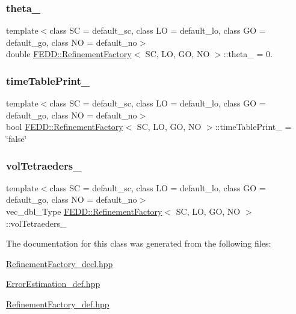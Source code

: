 \subsubsection{\texorpdfstring{theta\+\_\+}{theta\_}}
{\footnotesize\ttfamily template$<$class SC  = default\+\_\+sc, class LO  = default\+\_\+lo, class GO  = default\+\_\+go, class NO  = default\+\_\+no$>$ \\
double \hyperlink{classFEDD_1_1RefinementFactory}{F\+E\+D\+D\+::\+Refinement\+Factory}$<$ SC, LO, GO, NO $>$\+::theta\+\_\+ = 0.}

\mbox{\label{classFEDD_1_1RefinementFactory_ad7ff86aebffde685089d462f2d04203e}} 
\subsubsection{\texorpdfstring{time\+Table\+Print\+\_\+}{timeTablePrint\_}}
{\footnotesize\ttfamily template$<$class SC  = default\+\_\+sc, class LO  = default\+\_\+lo, class GO  = default\+\_\+go, class NO  = default\+\_\+no$>$ \\
bool \hyperlink{classFEDD_1_1RefinementFactory}{F\+E\+D\+D\+::\+Refinement\+Factory}$<$ SC, LO, GO, NO $>$\+::time\+Table\+Print\+\_\+ = \char`\"{}false\char`\"{}}

\mbox{\label{classFEDD_1_1RefinementFactory_a7043a525164368b18359a399dede06c3}} 
\subsubsection{\texorpdfstring{vol\+Tetraeders\+\_\+}{volTetraeders\_}}
{\footnotesize\ttfamily template$<$class SC  = default\+\_\+sc, class LO  = default\+\_\+lo, class GO  = default\+\_\+go, class NO  = default\+\_\+no$>$ \\
vec\+\_\+dbl\+\_\+\+Type \hyperlink{classFEDD_1_1RefinementFactory}{F\+E\+D\+D\+::\+Refinement\+Factory}$<$ SC, LO, GO, NO $>$\+::vol\+Tetraeders\+\_\+\hspace{0.3cm}{\ttfamily [protected]}}



The documentation for this class was generated from the following files\+:\begin{DoxyCompactItemize}
\item 
\hyperlink{RefinementFactory__decl_8hpp}{Refinement\+Factory\+\_\+decl.\+hpp}\item 
\hyperlink{ErrorEstimation__def_8hpp}{Error\+Estimation\+\_\+def.\+hpp}\item 
\hyperlink{RefinementFactory__def_8hpp}{Refinement\+Factory\+\_\+def.\+hpp}\end{DoxyCompactItemize}
